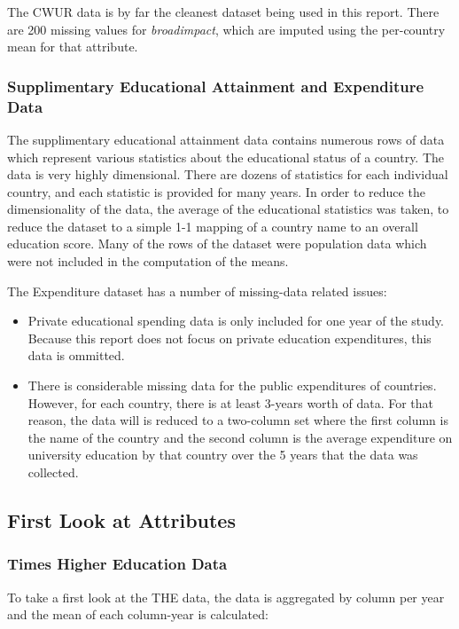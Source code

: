 \documentclass[12pt]{article}
\begin{document}
The CWUR data is by far the cleanest dataset being used in this report. There are 200 missing values for \textit{broad\textunderscore impact}, which are imputed using the per-country mean for that attribute.

\subsubsection{Supplimentary Educational Attainment and Expenditure Data}

The supplimentary educational attainment data contains numerous rows of data which represent various statistics about the educational status of a country. The data is very highly dimensional. There are dozens of statistics for each individual country, and each statistic is provided for many years. In order to reduce the dimensionality of the data, the average of the educational statistics was taken, to reduce the dataset to a simple 1-1 mapping of a country name to an overall education score. Many of the rows of the dataset were population data which were not included in the computation of the means.

The Expenditure dataset has a number of missing-data related issues:
\begin{itemize}
\item Private educational spending data is only included for one year of the study. Because this report does not focus on private education expenditures, this data is ommitted.
\item There is considerable missing data for the public expenditures of countries. However, for each country, there is at least 3-years worth of data. For that reason, the data will is reduced to a two-column set where the first column is the name of the country and the second column is the average expenditure on university education by that country over the 5 years that the data was collected.
\end{itemize}

\subsection{First Look at Attributes}

\subsubsection{Times Higher Education Data}

To take a first look at the THE data, the data is aggregated by column per year and the mean of each column-year is calculated:
\end{document}
